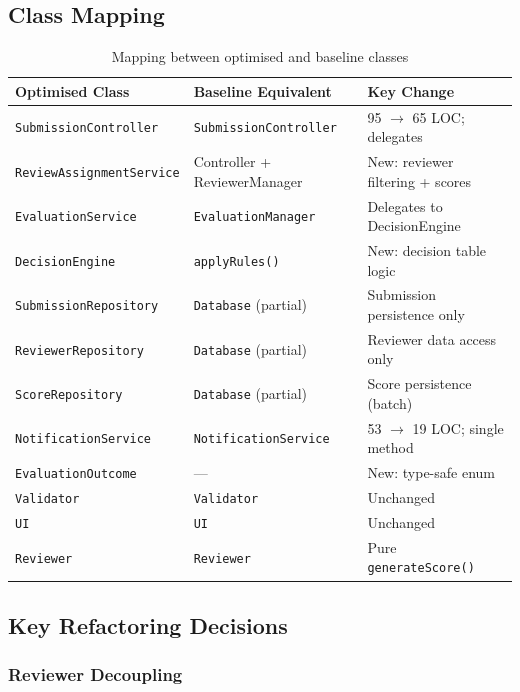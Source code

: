 \documentclass[12pt, a4paper]{article}
\begin{document}
\subsection{Class Mapping}

\begin{table}[H]
\centering
\caption{Mapping between optimised and baseline classes}
\label{tab:class-mapping}
\begin{tabularx}{\textwidth}{l l X}
    \toprule
    \textbf{Optimised Class} & \textbf{Baseline Equivalent} & \textbf{Key Change} \\
    \midrule
    \texttt{SubmissionController} & \texttt{SubmissionController} & 95 $\rightarrow$ 65 LOC; delegates \\
    \texttt{ReviewAssignmentService} & Controller + ReviewerManager & New: reviewer filtering + scores \\
    \texttt{EvaluationService} & \texttt{EvaluationManager} & Delegates to DecisionEngine \\
    \texttt{DecisionEngine} & \texttt{applyRules()} & New: decision table logic \\
    \texttt{SubmissionRepository} & \texttt{Database} (partial) & Submission persistence only \\
    \texttt{ReviewerRepository} & \texttt{Database} (partial) & Reviewer data access only \\
    \texttt{ScoreRepository} & \texttt{Database} (partial) & Score persistence (batch) \\
    \texttt{NotificationService} & \texttt{NotificationService} & 53 $\rightarrow$ 19 LOC; single method \\
    \texttt{EvaluationOutcome} & --- & New: type-safe enum \\
    \texttt{Validator} & \texttt{Validator} & Unchanged \\
    \texttt{UI} & \texttt{UI} & Unchanged \\
    \texttt{Reviewer} & \texttt{Reviewer} & Pure \texttt{generateScore()} \\
    \bottomrule
\end{tabularx}
\end{table}

\subsection{Key Refactoring Decisions}

\subsubsection{Reviewer Decoupling}
\end{document}
